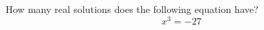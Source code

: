 \documentclass{ximera}
\author{David Kish}
\begin{document}
\begin{exercise}
How many real solutions does the following equation have? \\
\[
x^3=-27
\]
\begin{multipleChoice}  
\end{multipleChoice}  
\end{exercise}
\end{document}
